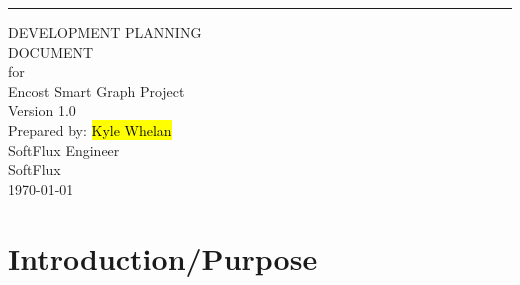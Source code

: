 \documentclass{scrreprt}
\date{}
\def\myversion{1.0 }
\begin{document}
\begin{flushright}
    \rule{16cm}{5pt}\vskip1cm
    \begin{bfseries}
        \Huge{DEVELOPMENT PLANNING \\DOCUMENT}\\
        \vspace{1.5cm}
        for\\
        \vspace{1.5cm}
        Encost Smart Graph Project\\
        \vspace{1.5cm}
        \LARGE{Version \myversion}\\
        \vspace{1.5cm}
        Prepared by: \hl{Kyle Whelan}\\
        SoftFlux Engineer \\
        \vspace{1.5cm}
        SoftFlux \\
        \vspace{1.5cm}
        \today\\
    \end{bfseries}
\end{flushright}

\tableofcontents

\newpage




% 
% 
%
\chapter{Introduction/Purpose}
\end{document}
